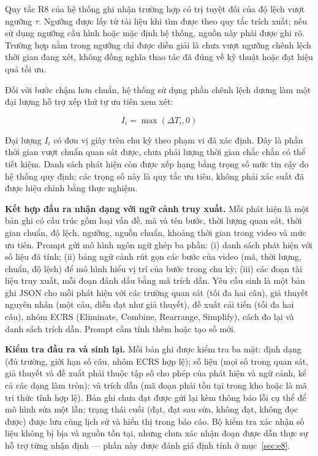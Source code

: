 Quy tắc R8 của hệ thống ghi nhận trường hợp có trị tuyệt đối của độ lệch vượt ngưỡng $\tau$. Ngưỡng được lấy từ tài liệu khi tìm được theo quy tắc trích xuất; nếu sử dụng ngưỡng cấu hình hoặc mặc định hệ thống, nguồn này phải được ghi rõ. Trường hợp nằm trong ngưỡng chỉ được diễn giải là chưa vượt ngưỡng chênh lệch thời gian đang xét, không đồng nghĩa thao tác đã đúng về kỹ thuật hoặc đạt hiệu quả tối ưu.

Đối với bước chậm hơn chuẩn, hệ thống sử dụng phần chênh lệch dương làm một đại lượng hỗ trợ xếp thứ tự ưu tiên xem xét:

\begin{equation} I_i = \max(\Delta T_i, 0) \end{equation}

Đại lượng $I_i$ có đơn vị giây trên chu kỳ theo phạm vi đã xác định. Đây là phần thời gian vượt chuẩn quan sát được, chưa phải lượng thời gian chắc chắn có thể tiết kiệm. Danh sách phát hiện còn được xếp hạng bằng trọng số mức tin cậy do hệ thống quy định; các trọng số này là quy tắc ưu tiên, không phải xác suất đã được hiệu chỉnh bằng thực nghiệm.

\textbf{Kết hợp đầu ra nhận dạng với ngữ cảnh truy xuất.} Mỗi phát hiện là một bản ghi có cấu trúc gồm loại vấn đề, mã và tên bước, thời lượng quan sát, thời gian chuẩn, độ lệch, ngưỡng, nguồn chuẩn, khoảng thời gian trong video và mức ưu tiên. Prompt gửi mô hình ngôn ngữ ghép ba phần: (i) danh sách phát hiện với số liệu đã tính; (ii) bảng ngữ cảnh rút gọn các bước của video (mã, thời lượng, chuẩn, độ lệch) để mô hình hiểu vị trí của bước trong chu kỳ; (iii) các đoạn tài liệu truy xuất, mỗi đoạn đánh dấu bằng mã trích dẫn. Yêu cầu sinh là một bản ghi JSON cho mỗi phát hiện với các trường quan sát (tối đa hai câu), giả thuyết nguyên nhân (một câu, diễn đạt như giả thuyết), đề xuất cải tiến (tối đa hai câu), nhóm ECRS (Eliminate, Combine, Rearrange, Simplify), cách đo lại và danh sách trích dẫn. Prompt cấm tính thêm hoặc tạo số mới.

\textbf{Kiểm tra đầu ra và sinh lại.} Mỗi bản ghi được kiểm tra ba mặt: định dạng (đủ trường, giới hạn số câu, nhóm ECRS hợp lệ); số liệu (mọi số trong quan sát, giả thuyết và đề xuất phải thuộc tập số cho phép của phát hiện và ngữ cảnh, kể cả các dạng làm tròn); và trích dẫn (mã đoạn phải tồn tại trong kho hoặc là mã tri thức tĩnh hợp lệ). Bản ghi chưa đạt được gửi lại kèm thông báo lỗi cụ thể để mô hình sửa một lần; trạng thái cuối (đạt, đạt sau sửa, không đạt, không đọc được) được lưu cùng lịch sử và hiển thị trong báo cáo. Bộ kiểm tra xác nhận số liệu không bị bịa và nguồn tồn tại, nhưng chưa xác nhận đoạn được dẫn thực sự hỗ trợ từng nhận định — phần này được đánh giá định tính ở mục~\ref{sec:e8}.
